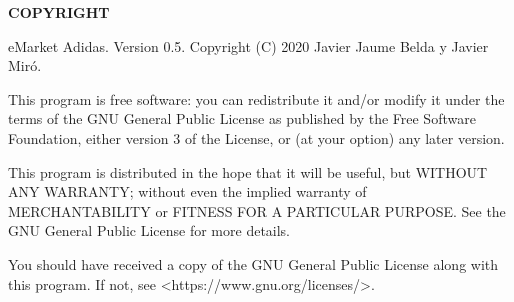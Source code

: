 {\bfseries C\+O\+P\+Y\+R\+I\+G\+HT} \begin{DoxyVerb}eMarket Adidas. Version 0.5.
Copyright (C) 2020  Javier Jaume Belda y Javier Miró.

This program is free software: you can redistribute it and/or modify
it under the terms of the GNU General Public License as published by
the Free Software Foundation, either version 3 of the License, or
(at your option) any later version.

This program is distributed in the hope that it will be useful,
but WITHOUT ANY WARRANTY; without even the implied warranty of
MERCHANTABILITY or FITNESS FOR A PARTICULAR PURPOSE.  See the
GNU General Public License for more details.

You should have received a copy of the GNU General Public License
along with this program.  If not, see <https://www.gnu.org/licenses/>.\end{DoxyVerb}
 